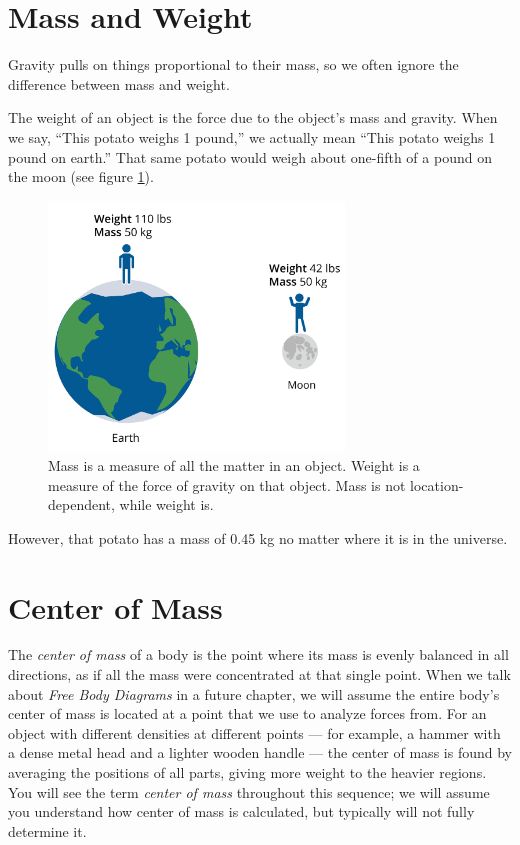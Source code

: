 \section{Mass and Weight}

Gravity pulls on things proportional to their mass, so we often
ignore the difference between mass and weight.

The weight of an object is the force due to the object's mass and
gravity. When we say, ``This potato weighs 1 pound,'' we actually mean
``This potato weighs 1 pound on earth.'' That same potato would weigh
about one-fifth of a pound on the moon (see figure \ref{fig:massvweight}).

\begin{figure}[htbp]
\centering
\includegraphics[width=0.7\textwidth]{massvweight.png}
\caption{Mass is a measure of all the matter in an object. Weight is a measure of 
the force of gravity on that object. Mass is not location-dependent, while weight 
is.}
\label{fig:massvweight}
\end{figure}

However, that potato has a mass of 0.45 kg no matter where it is in the universe.
\section{Center of Mass}
The \emph{center of mass} of a body is the point where its mass is evenly balanced in all directions, as if all the mass were concentrated at that single point. When we talk about \emph{Free Body Diagrams} in a future chapter, we will assume the entire body's center of mass is located at a point that we use to analyze forces from. For an object with different densities at different points — for example, a hammer with a dense metal head and a lighter wooden handle — the center of mass is found by averaging the positions of all parts, giving more weight to the heavier regions. You will see the term \emph{center of mass} throughout this sequence; we will assume you understand how center of mass is calculated, but typically will not fully determine it.

